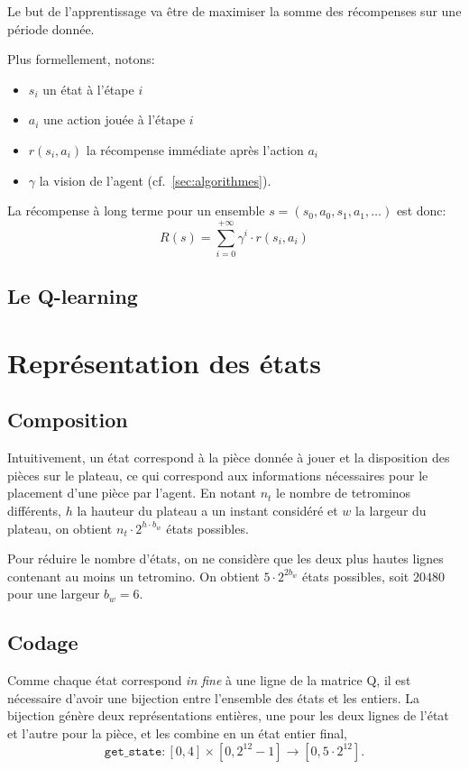 \documentclass{report}
\begin{document}
Le but de l'apprentissage va être de maximiser la somme des récompenses sur une
période donnée.

Plus formellement, notons:
\begin{itemize}
    \item \( s_i \) un état à l'étape \( i \)
    \item \( a_i \) une action jouée à l'étape \( i \)
    \item \( r(s_i, a_i) \) la récompense immédiate après l'action \( a_i \)
    \item \( \gamma \) la vision de l'agent (cf.~\ref{sec:algorithmes}).
\end{itemize}

La récompense à long terme pour un ensemble
\( s = (s_0, a_0, s_1, a_1, \hdots) \) est donc:
\[
  R(s) = \sum_{i=0}^{+\infty}\gamma^i \cdot r(s_i, a_i)
\]


\subsection{Le Q-learning}



\section{Représentation des états}

\subsection{Composition}
Intuitivement, un état correspond à la pièce donnée à jouer et la disposition
des pièces sur le plateau, ce qui correspond aux informations nécessaires pour
le placement d'une pièce par l'agent. En notant \(n_t\) le nombre de tetrominos
différents, \( h \) la hauteur du plateau a un instant considéré  et \(w\) la
largeur du plateau, on obtient \(n_t \cdot 2^{h \cdot b_w}\) états possibles.

Pour réduire le nombre d'états, on ne considère que les deux plus hautes lignes
contenant au moins un tetromino. On obtient \(5\cdot 2^{2 b_w}\) états
possibles, soit \(20480\) pour une largeur \( b_w = 6 \).

\subsection{Codage}
Comme chaque état correspond \textit{in fine} à une ligne de la matrice Q, il est
nécessaire d'avoir une bijection entre l'ensemble des états et les entiers. La
bijection génère deux représentations entières, une pour les deux lignes de
l'état et l'autre pour la pièce, et les combine en un état entier final,
\[
  \texttt{get\_state}\colon [0,4]\times [0, 2^{12} - 1] \to [0, 5\cdot 2^{12}].
\]
\end{document}
